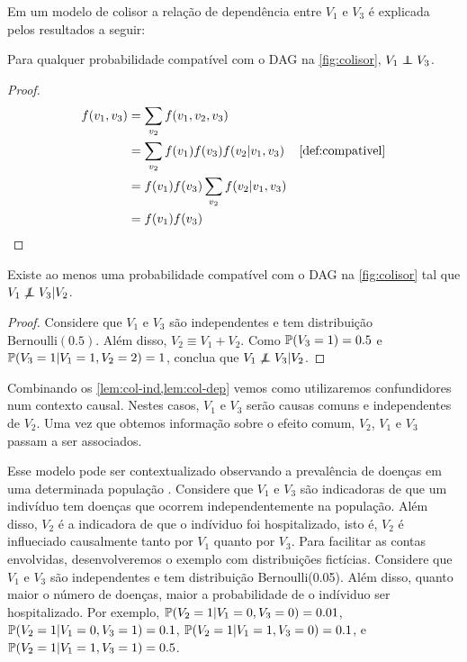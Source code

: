 Em um modelo de colisor 
a relação de dependência entre 
$V_1$ e $V_3$ é explicada pelos
resultados a seguir:

\begin{lemma}
 \label{lem:col-ind}
 Para qualquer probabilidade compatível com 
 o DAG na \cref{fig:colisor},
 $V_1 \ind V_3$.
\end{lemma}

\begin{proof}
 \begin{align*}
  f(v_1,v_3) 
  &= \sum_{v_2} f(v_1, v_2, v_3) \\
  &= \sum_{v_2} f(v_1)f(v_3)f(v_2|v_1,v_3) 
  & \text{\cref{def:compativel}} \\
  &= f(v_1)f(v_3) \sum_{v_2}f(v_2|v_1,v_3) \\
  &= f(v_1)f(v_3)
 \end{align*}
\end{proof}

\begin{lemma}
 \label{lem:col-dep}
 Existe ao menos uma probabilidade compatível com
 o DAG na \cref{fig:colisor} tal que
 $V_1 \not\ind V_3 | V_2$.
\end{lemma}

\begin{proof}
 Considere que $V_1$ e $V_3$ são
 independentes e tem distribuição $\text{Bernoulli}(0.5)$.
 Além disso, $V_2 \equiv V_1+V_2$.
 Como $\P(V_3 = 1) = 0.5$ e
 $\P(V_3=1|V_1=1,V_2=2) = 1$, conclua que
 $V_1 \not\ind V_3 | V_2$.
\end{proof}

Combinando os \cref{lem:col-ind,lem:col-dep} vemos 
como utilizaremos confundidores num contexto causal.
Nestes casos, $V_1$ e $V_3$ serão causas comuns e independentes de $V_2$.
Uma vez que obtemos informação sobre o efeito comum, $V_2$,
$V_1$ e $V_3$ passam a ser associados.

Esse modelo pode ser contextualizado observando
a prevalência de doenças em uma determinada população 
\citep{Sackett1979}.
Considere que  $V_1$ e $V_3$ são 
indicadoras de que um indivíduo tem
doenças que ocorrem independentemente na população.
Além disso, $V_2$ é a indicadora de que 
o indíviduo foi hospitalizado, isto é,
$V_2$ é influeciado causalmente 
tanto por $V_1$ quanto por $V_3$.
Para facilitar as contas envolvidas,
desenvolveremos o exemplo com distribuições fictícias.
Considere que
$V_1$ e $V_3$ são independentes e
tem distribuição Bernoulli(0.05).
Além disso, quanto maior o número de doenças,
maior a probabilidade de o indíviduo ser hospitalizado.
Por exemplo,
$\P(V_2=1|V_1=0,V_3=0) = 0.01$,
$\P(V_2=1|V_1=0,V_3=1) = 0.1$,
$\P(V_2=1|V_1=1,V_3=0) = 0.1$, e
$\P(V_2=1|V_1=1,V_3=1) = 0.5$.

